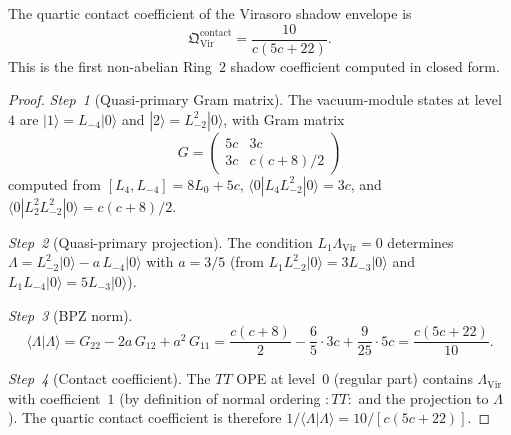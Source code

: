 \begin{theorem}
\label{thm:nms-virasoro-quartic-explicit}
The quartic contact coefficient of the Virasoro shadow envelope is
\begin{equation}
\label{eq:nms-virasoro-quartic-explicit}
\mathfrak Q^{\mathrm{contact}}_{\mathrm{Vir}}
= \frac{10}{c(5c+22)}.
\end{equation}
This is the first non-abelian Ring~$2$ shadow coefficient
computed in closed form.
\end{theorem}

\begin{proof}
\emph{Step~1} (Quasi-primary Gram matrix).
The vacuum-module states at level~$4$ are
$|1\rangle = L_{-4}|0\rangle$ and
$|2\rangle = L_{-2}^2|0\rangle$, with Gram matrix
\[
G = \begin{pmatrix} 5c & 3c \\ 3c & c(c+8)/2 \end{pmatrix}
\]
computed from $[L_4, L_{-4}] = 8L_0 + 5c$,
$\langle 0|L_4 L_{-2}^2|0\rangle = 3c$, and
$\langle 0|L_2^2 L_{-2}^2|0\rangle = c(c+8)/2$.

\emph{Step~2} (Quasi-primary projection).
The condition $L_1 \Lambda_{\mathrm{Vir}} = 0$ determines
$\Lambda = L_{-2}^2|0\rangle - a\,L_{-4}|0\rangle$ with
$a = 3/5$ (from $L_1 L_{-2}^2|0\rangle = 3L_{-3}|0\rangle$
and $L_1 L_{-4}|0\rangle = 5L_{-3}|0\rangle$).

\emph{Step~3} (BPZ norm).
\[
\langle\Lambda|\Lambda\rangle
= G_{22} - 2a\,G_{12} + a^2\,G_{11}
= \frac{c(c+8)}{2} - \frac{6}{5}\cdot 3c + \frac{9}{25}\cdot 5c
= \frac{c(5c+22)}{10}.
\]

\emph{Step~4} (Contact coefficient).
The $TT$ OPE at level~$0$ (regular part) contains
$\Lambda_{\mathrm{Vir}}$ with coefficient~$1$
(by definition of normal ordering $:TT:$ and the projection to
$\Lambda$). The quartic contact coefficient is therefore
$1/\langle\Lambda|\Lambda\rangle = 10/[c(5c+22)]$.
\end{proof}

